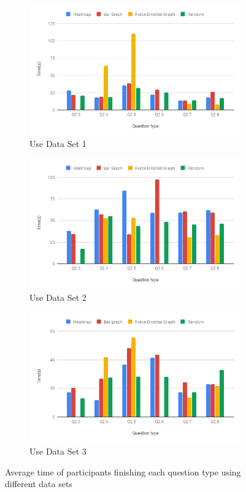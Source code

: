 \begin{figure}[h]
	\centering
	\begin{subfigure}[b]{0.48\textwidth}
		\centering
		\includegraphics[width=\textwidth]{pictures/Time1}
		\caption{Use Data Set 1}
	\end{subfigure}
	\hfill
	\begin{subfigure}[b]{0.48\textwidth}
		\centering
		\includegraphics[width=\textwidth]{pictures/Time2}
		\caption{Use Data Set 2}
	\end{subfigure}
	\hfill
	\begin{subfigure}[b]{0.48\textwidth}
		\centering
		\includegraphics[width=\textwidth]{pictures/Time3}
		\caption{Use Data Set 3}
	\end{subfigure}
	\caption{Average time of participants finishing each question type using different data sets}
	\label{fig:averageDS}
\end{figure}

